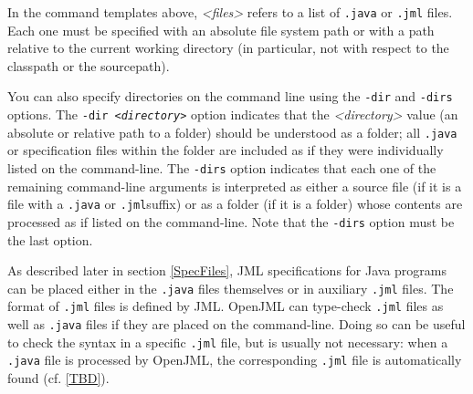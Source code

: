 \documentclass{report}%
\begin{document}
In the command templates above, {\it <files>} refers to a list of {\tt .java} or {\tt .jml} files.
Each one must be specified with an absolute file system path or with a path relative
to the current working directory (in particular, not with respect to the classpath or
the sourcepath). 

You can also specify directories on the command line using the {\tt -dir} and {\tt -dirs} options.
The {\tt -dir {\it <directory>}} option indicates that the {\it <directory>} value (an absolute or
relative path to a folder) should be understood as a folder; all {\tt .java} or specification files
within the folder are included as if they were individually listed on the command-line. The
{\tt -dirs} option indicates that each one of the remaining command-line arguments is interpreted as 
either a source file (if it is a file with a {\tt .java} or {\tt .jml}suffix) or as a folder (if it is a folder)
whose contents are processed as if listed on the command-line. Note that the {\tt -dirs} option must be
the last option.

As described later in section \ref{SpecFiles}, JML specifications for Java programs can be placed either in the 
{\tt .java} files themselves or in auxiliary {\tt .jml} files. The format
of {\tt .jml} files is defined by JML. OpenJML can type-check 
{\tt .jml} files as well as {\tt .java} files if they are placed on the 
command-line. Doing so can be useful to check the syntax in a specific
{\tt .jml} file, but is usually not necessary: when a {\tt .java} file is
processed by OpenJML, the corresponding {\tt .jml} file is automatically found (cf. \ref{TBD}).
\end{document}
